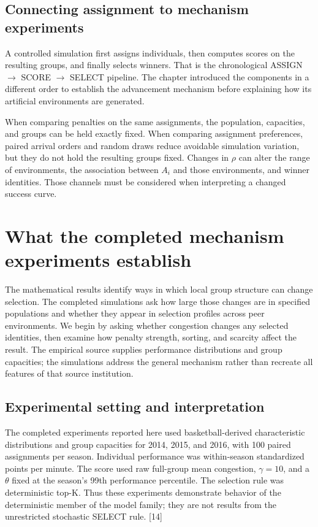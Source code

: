 \subsection{Connecting assignment to mechanism experiments}\label{connecting-assignment-to-mechanism-experiments}

A controlled simulation first assigns individuals, then computes scores on the resulting groups, and finally selects winners. That is the chronological ASSIGN \ensuremath{\to} SCORE \ensuremath{\to} SELECT pipeline. The chapter introduced the components in a different order to establish the advancement mechanism before explaining how its artificial environments are generated.

When comparing penalties on the same assignments, the population, capacities, and groups can be held exactly fixed. When comparing assignment preferences, paired arrival orders and random draws reduce avoidable simulation variation, but they do not hold the resulting groups fixed. Changes in \(\rho\) can alter the range of environments, the association between \(A_{i}\) and those environments, and winner identities. Those channels must be considered when interpreting a changed success curve.

\section{What the completed mechanism experiments establish}\label{what-the-completed-mechanism-experiments-establish}

The mathematical results identify ways in which local group structure can change selection. The completed simulations ask how large those changes are in specified populations and whether they appear in selection profiles across peer environments. We begin by asking whether congestion changes any selected identities, then examine how penalty strength, sorting, and scarcity affect the result. The empirical source supplies performance distributions and group capacities; the simulations address the general mechanism rather than recreate all features of that source institution.

\subsection{Experimental setting and interpretation}\label{experimental-setting-and-interpretation}

The completed experiments reported here used basketball-derived characteristic distributions and group capacities for 2014, 2015, and 2016, with 100 paired assignments per season. Individual performance was within-season standardized points per minute. The score used raw full-group mean congestion, \(\gamma = 10\), and a \(\theta\) fixed at the season's 99th performance percentile. The selection rule was deterministic top-K. Thus these experiments demonstrate behavior of the deterministic member of the model family; they are not results from the unrestricted stochastic SELECT rule. {[}14{]}

